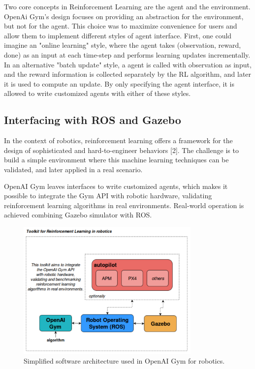 Two core concepts in Reinforcement Learning are the agent and the environment. OpenAi Gym's design focuses on providing an abstraction for the environment, but not for the agent. This choice was to maximize convenience for users and allow them to implement different styles of agent interface. First, one could imagine an "online learning" style, where the agent takes (observation, reward, done) as an input at each time-step and performs learning updates incrementally. In an alternative "batch update" style, a agent is called with observation as input, and the reward information is collected separately by the RL algorithm, and later it is used to compute an update. By only specifying the agent interface, it is allowed to write customized agents with either of these styles.

\subsection{Interfacing with ROS and Gazebo}

In the context of robotics, reinforcement learning offers a framework for the design of sophisticated and hard-to-engineer behaviors [2]. The challenge is to build a simple environment where this machine learning techniques can be validated, and later applied in a real scenario.

OpenAI Gym leaves interfaces to write customized agents, which makes it possible to integrate the Gym API with robotic hardware, validating reinforcement learning algorithms in real environments. Real-world operation is achieved combining Gazebo simulator with ROS.

\begin{figure}[h]
\centering
\includegraphics[width=0.8\textwidth]{figs/ch2/toolkit-of-openaigym}
\caption{Simplified software architecture used in OpenAI Gym for robotics.}
\label{fig:openai-archi}
\end{figure}

